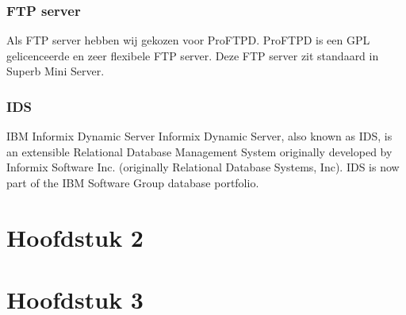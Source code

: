 \documentclass[12pt]{article}
\begin{document}
\subsubsection{FTP server}
Als FTP server hebben wij gekozen voor ProFTPD. ProFTPD is een GPL gelicenceerde en zeer flexibele FTP server. Deze FTP server zit standaard in Superb Mini Server.
\subsubsection{IDS}
IBM Informix Dynamic Server
Informix Dynamic Server, also known as IDS, is an extensible Relational Database Management System originally developed by Informix Software Inc. (originally Relational Database Systems, Inc). IDS is now part of the IBM Software Group database portfolio.
\section{Hoofdstuk 2}
\lipsum[0-4]
\section{Hoofdstuk 3}
\lipsum[0-4]
\clearpage 
\end{document}
